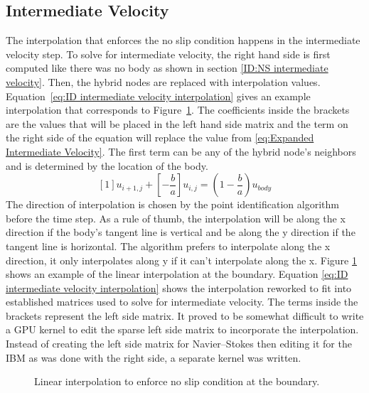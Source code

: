 \subsection{Intermediate Velocity}
\label{sec:ID fadlun intermediate velocity}
The interpolation that enforces the no slip condition happens in the intermediate velocity step. 
To solve for intermediate velocity, the right hand side is first computed like there was no body as shown in section \ref{ID:NS intermediate velocity}. 
Then, the hybrid nodes are replaced with interpolation values. 
Equation~\eqref{eq:ID intermediate velocity interpolation} gives an example interpolation that corresponds to Figure~\ref{fig:ID linear interpolation}. 
The coefficients inside the brackets are the values that will be placed in the left hand side matrix and the term on the right side of the equation will replace the value from \ref{eq:Expanded Intermediate Velocity}. 
The first term can be any of the hybrid node's neighbors and is determined by the location of the body. 
\begin{equation}
\left[1\right]u_{i+1,j} + \left[-\frac{b}{a}\right]u_{i,j} = \left(1-\frac{b}{a}\right)u_{body}
\label{eq:ID intermediate velocity interpolation}
\end{equation}
The direction of interpolation is chosen by the point identification algorithm before the time step. 
As a rule of thumb, the interpolation will be along the x direction if the body's tangent line is vertical and be along the y direction if the tangent line is horizontal. 
The algorithm prefers to interpolate along the x direction, it only interpolates along y if it can't interpolate along the x. 
Figure \ref{fig:ID linear interpolation} shows an example of the linear interpolation at the boundary. 
Equation \eqref{eq:ID intermediate velocity interpolation} shows the interpolation reworked to fit into established matrices used to solve for intermediate velocity. 
The terms inside the brackets represent the left side matrix. 
It proved to be somewhat difficult to write a GPU kernel to edit the sparse left side matrix to incorporate the interpolation. 
Instead of creating the left side matrix for Navier--Stokes then editing it for the IBM as was done with the right side, a separate kernel was written. 

\begin{figure}[!htb]
	\centering
	
	\caption{Linear interpolation to enforce no slip condition at the boundary.}
	\label{fig:ID linear interpolation}
\end{figure}

